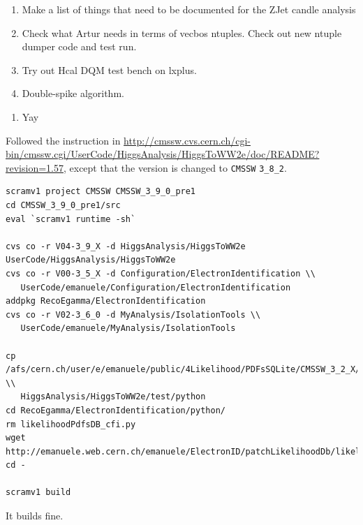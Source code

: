 

\begin{enumerate}
\item Make a list of things that need to be documented for the ZJet candle analysis
\item Check what Artur needs in terms of vecbos ntuples.  Check out new ntuple dumper code and test run.
\item Try out Hcal DQM test bench on lxplus.
\item Double-spike algorithm.
\end{enumerate}


\begin{enumerate}
\item Yay
\end{enumerate}


Followed the instruction in \url{http://cmssw.cvs.cern.ch/cgi-bin/cmssw.cgi/UserCode/HiggsAnalysis/HiggsToWW2e/doc/README?revision=1.57},
except that the version is changed to \texttt{CMSSW} \texttt{3\_8\_2}.

\begin{verbatim}
scramv1 project CMSSW CMSSW_3_9_0_pre1
cd CMSSW_3_9_0_pre1/src
eval `scramv1 runtime -sh`

cvs co -r V04-3_9_X -d HiggsAnalysis/HiggsToWW2e UserCode/HiggsAnalysis/HiggsToWW2e
cvs co -r V00-3_5_X -d Configuration/ElectronIdentification \\
   UserCode/emanuele/Configuration/ElectronIdentification
addpkg RecoEgamma/ElectronIdentification
cvs co -r V02-3_6_0 -d MyAnalysis/IsolationTools \\
   UserCode/emanuele/MyAnalysis/IsolationTools

cp /afs/cern.ch/user/e/emanuele/public/4Likelihood/PDFsSQLite/CMSSW_3_2_X/electronIdLikelihoodTkIsolated.db \\
   HiggsAnalysis/HiggsToWW2e/test/python
cd RecoEgamma/ElectronIdentification/python/
rm likelihoodPdfsDB_cfi.py
wget http://emanuele.web.cern.ch/emanuele/ElectronID/patchLikelihoodDb/likelihoodPdfsDB_cfi.py
cd -

scramv1 build
\end{verbatim}

It builds fine.


